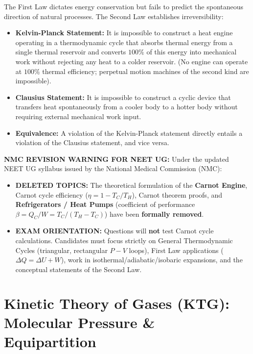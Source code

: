 \documentclass[10pt,a4paper]{article}
\begin{document}
\begin{conceptbox}
The First Law dictates energy conservation but fails to predict the spontaneous direction of natural processes. The Second Law establishes irreversibility:
\begin{itemize}
  \item \textbf{Kelvin-Planck Statement:} It is impossible to construct a heat engine operating in a thermodynamic cycle that absorbs thermal energy from a single thermal reservoir and converts $100\%$ of this energy into mechanical work without rejecting any heat to a colder reservoir. (No engine can operate at $100\%$ thermal efficiency; perpetual motion machines of the second kind are impossible).
  \item \textbf{Clausius Statement:} It is impossible to construct a cyclic device that transfers heat spontaneously from a cooler body to a hotter body without requiring external mechanical work input.
  \item \textbf{Equivalence:} A violation of the Kelvin-Planck statement directly entails a violation of the Clausius statement, and vice versa.
\end{itemize}
\end{conceptbox}

\begin{trapbox}
\textbf{NMC REVISION WARNING FOR NEET UG:}
Under the updated NEET UG syllabus issued by the National Medical Commission (NMC):
\begin{itemize}
  \item \textbf{DELETED TOPICS:} The theoretical formulation of the \textbf{Carnot Engine}, Carnot cycle efficiency ($\eta = 1 - T_C/T_H$), Carnot theorem proofs, and \textbf{Refrigerators / Heat Pumps} (coefficient of performance $\beta = Q_C/W = T_C/(T_H - T_C)$) have been \textbf{formally removed}.
  \item \textbf{EXAM ORIENTATION:} Questions will \textbf{not} test Carnot cycle calculations. Candidates must focus strictly on General Thermodynamic Cycles (triangular, rectangular $P-V$ loops), First Law applications ($\Delta Q = \Delta U + W$), work in isothermal/adiabatic/isobaric expansions, and the conceptual statements of the Second Law.
\end{itemize}
\end{trapbox}

\section{Kinetic Theory of Gases (KTG): Molecular Pressure \& Equipartition}
\end{document}
